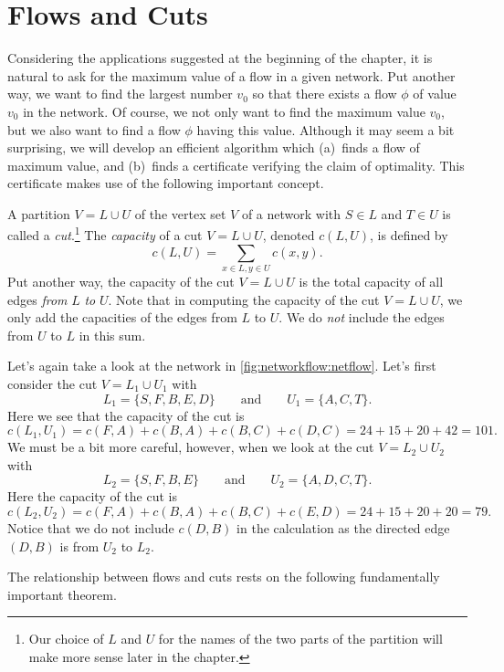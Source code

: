 \section{Flows and Cuts}

Considering the applications suggested at the beginning of the
chapter, it is natural to ask for the maximum value of a flow in a
given network. Put another way, we want to find the largest number
$v_0$ so that there exists a flow $\phi$ of value $v_0$ in the
network. Of course, we not only want to find the maximum value $v_0$,
but we also want to find a flow $\phi$ having this value.  Although it
may seem a bit surprising, we will develop an efficient algorithm
which (a)~finds a flow of maximum value, and (b)~finds a certificate
verifying the claim of optimality.  This certificate makes use of the
following important concept.

A partition $V=L\cup U$ of the vertex set $V$ of a network 
with $S\in L$ and $T\in U$ is called a
\textit{cut}.\footnote{Our choice of $L$ and $U$ for the names of the
  two parts of the partition will make more sense later in the
  chapter.}  The \textit{capacity} of a cut $V=L\cup U$, denoted
$c(L,U)$, is defined by
\[
c(L,U) = \sum_{x\in L,y\in U} c(x,y).
\]
Put another way, the capacity of the cut $V=L\cup U$ is the total
capacity of all edges \emph{from} $L$ \emph{to} $U$. Note that in
computing the capacity of the cut $V=L\cup U$, we only add the
capacities of the edges from $L$ to $U$.  We do \emph{not} include the
edges from $U$ to $L$ in this sum.

\begin{example}
  Let's again take a look at the network in
  \autoref{fig:networkflow:netflow}. Let's first consider the cut
  $V=L_1\cup U_1$ with
  \[L_1 = \{S,F,B,E,D\}\qquad\text{and}\qquad U_1= \{A,C,T\}.\]
  Here we see that the capacity of the cut is
  \[c(L_1,U_1) = c(F,A) + c(B,A) + c(B,C)+ c(D,C) = 24+15+20+42 =
  101.\]
  We must be a bit more careful, however, when we look at the cut
  $V=L_2\cup U_2$ with
  \[L_2 = \{S,F,B,E\}\qquad\text{and}\qquad U_2=\{A,D,C,T\}.\]
  Here the capacity of the cut is
  \[c(L_2,U_2) = c(F,A) + c(B,A) + c(B,C) + c(E,D) = 24+15+20+20=79.\]
  Notice that we do not include $c(D,B)$ in the calculation as the
  directed edge $(D,B)$ is from $U_2$ to $L_2$.
\end{example}

The relationship between flows and cuts rests on the following
fundamentally important theorem.

